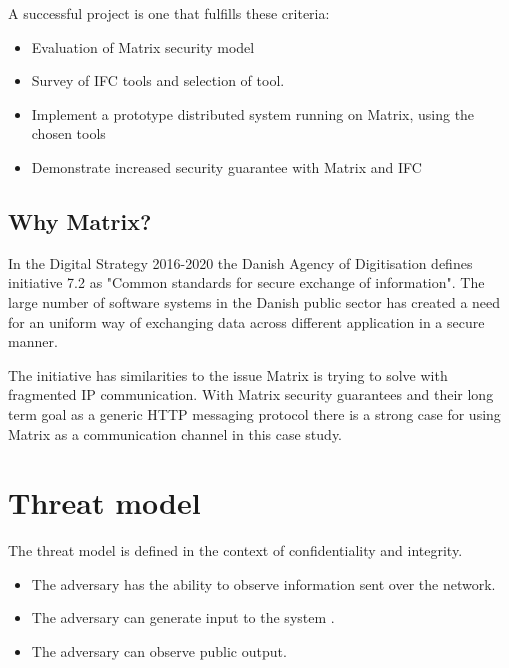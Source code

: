 A successful project is one that fulfills these criteria: 

\begin{itemize}
	\item Evaluation of Matrix security model
	\item Survey of IFC tools and selection of tool.
	\item Implement a prototype distributed system running on Matrix, using the chosen tools
	\item Demonstrate increased security guarantee with Matrix and IFC
\end{itemize}   


\subsection{Why Matrix?}
In the Digital Strategy 2016-2020 the Danish Agency of Digitisation defines initiative 7.2 as "Common standards for secure exchange of information". The large number of software systems in the Danish public sector has created a need for an uniform way of exchanging data across different application in a secure manner. 

The initiative has similarities to the issue Matrix is trying to solve with fragmented IP communication. With Matrix security guarantees and their long term goal as a generic HTTP messaging protocol there is a strong case for using Matrix as a communication channel in this case study.


 
 
 \section{Threat model}
 The threat model is defined in the context of confidentiality and integrity.
 \begin{itemize}
 	\item The adversary has the ability to observe information sent over the network.
 	\item The adversary can generate input to the system .
 	\item The adversary can observe public output.   
 \end{itemize}
 
